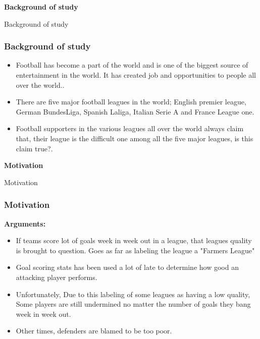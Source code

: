 \documentclass[11pt]{beamer}
\begin{document}
  \begin{frame}
  \color{blue}
    \begin{center}
        \Huge\textbf{Background of study}
    \end{center}
	\end{frame}
\begin{frame}{Background of study}	
		\frametitle{Background of study}

  \begin{itemize}
  \setlength\itemsep{3em}
  \item Football has become a part of the world and is one of the biggest source of entertainment in the world. It has created job and opportunities to people all over the world..
  \item There are five major football leagues in the world; English premier league, German BundesLiga, Spanish Laliga, Italian Serie A and France League one.
  \item Football supporters in the various leagues all over the world always claim that, their league is the difficult one among all the five major leagues, is this claim true?.
  
  \end{itemize}
		
\end{frame}

\begin{frame}
\color{blue}
    \begin{center}
        \Huge\textbf{Motivation}
    \end{center}
	\end{frame}
	
	\begin{frame}{Motivation}
 
		\frametitle{Motivation}
   \textbf{Arguments:}
  \begin{itemize}
  \setlength\itemsep{1.5em}
 
      \item If teams score lot of goals week in week out in a league, that leagues quality is brought to question. Goes as far as labeling the league a "Farmers League"
      \item Goal scoring stats has been used a lot of late to determine how good an attacking player performs. 
      \item Unfortunately, Due to this labeling of some leagues as having a low quality, Some players are still undermined no matter the number of goals they bang week in week out.
      \item Other times, defenders are blamed to be too poor.
      
 \end{itemize}
	\end{frame}
\end{document}
